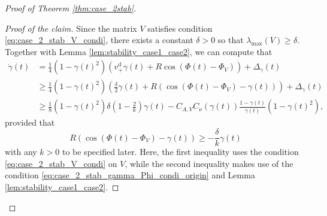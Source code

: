 \documentclass[10pt]{article}
\theoremstyle{definition}
\theoremstyle{definition}
\numberwithin{equation}{section}
\newcommand{\vDPlus}{v_+^{\text{d}}}
\newcommand{\Dgamma}{\Dot{\gamma}}
\newcommand{\lambdaMax}{\lambda_{\mathrm{max}}}
\newcommand{\DeltaGamma}{\Delta_{\gamma}}
\newcommand{\PhiV}{\Phi_{V}}
\begin{document}
\begin{proof}[Proof of Theorem \ref{thm:case_2stab}]
\begin{proof}[Proof of the claim]
Since the matrix $V$ satisfies condition \eqref{eq:case_2_stab_V_condi}, there exists a constant $\delta > 0$ so that $\lambdaMax(V) \geq \delta$.
Together with Lemma \ref{lem:stability_case1_case2}, we can compute that
\begin{equation}\label{eq:gamma_aux_ineq}
\begin{aligned}
\Dgamma(t) &= \frac{1}{4} (1 - \gamma(t)^2) \left( \vDPlus \gamma(t) + R \cos (\Phi(t) - \PhiV) \right) + \DeltaGamma(t)\\
&\geq \frac{1}{4} (1 - \gamma(t)^2) \left( \frac{\delta}{2} \gamma(t) + R \left( \cos (\Phi(t) - \PhiV) - \gamma(t) \right) \right) + \DeltaGamma(t)\\
&\geq \frac{1}{8} (1 - \gamma(t)^2) \delta \left( 1 - \frac{2}{k} \right)\gamma(t) - C_{A, V} C_{\nu} (\gamma(t)) \frac{1 - \gamma(t)}{\gamma(t)} (1 - \gamma(t)^2),
\end{aligned}
\end{equation}
provided that 
\begin{equation}\label{eq:case_2_stab_gamma_Phi_condi_origin}
R \left( \cos \left( \Phi(t) - \PhiV \right) - \gamma(t) \right) \geq - \frac{\delta}{k} \gamma(t)
\end{equation}
with any $k > 0$ to be specified later.
Here, the first inequality uses the condition \eqref{eq:case_2_stab_V_condi} on $V$, while the second inequality makes use of the condition \eqref{eq:case_2_stab_gamma_Phi_condi_origin} and Lemma \ref{lem:stability_case1_case2}.


\end{proof}
\end{proof}
\end{document}
